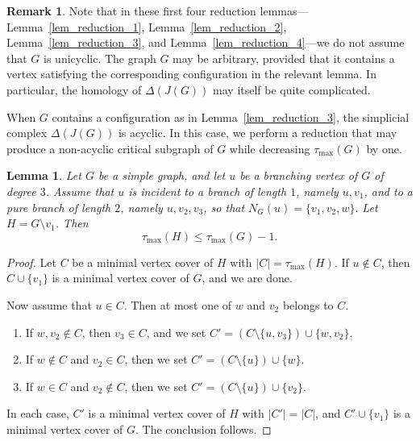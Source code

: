 \documentclass[12pt,amscd]{amsart}
\newtheorem{lem}[thm]{Lemma}
\theoremstyle{definition}
\newtheorem{rem}[thm]{Remark}
\begin{document}
\begin{rem}
Note that in these first four reduction lemmas---Lemma~\ref{lem_reduction_1}, Lemma~\ref{lem_reduction_2}, Lemma~\ref{lem_reduction_3}, and Lemma~\ref{lem_reduction_4}---we do not assume that $G$ is unicyclic. The graph $G$ may be arbitrary, provided that it contains a vertex satisfying the corresponding configuration in the relevant lemma. In particular, the homology of $\Delta(J(G))$ may itself be quite complicated.
\end{rem}

When $G$ contains a configuration as in Lemma~\ref{lem_reduction_3}, the simplicial complex $\Delta(J(G))$ is acyclic. In this case, we perform a reduction that may produce a non-acyclic critical subgraph of $G$ while decreasing $\tau_{\max}(G)$ by one.

\begin{lem}\label{lem_type_1_2}
Let $G$ be a simple graph, and let $u$ be a branching vertex of $G$ of degree $3$. Assume that $u$ is incident to a branch of length $1$, namely $u,v_1$, and to a pure branch of length $2$, namely $u,v_2,v_3$, so that \(N_G(u) = \{v_1,v_2,w\}.\) Let $H = G \setminus v_1$. Then
\[
\tau_{\max}(H) \le \tau_{\max}(G) - 1.
\]
\end{lem}

\begin{proof}
Let $C$ be a minimal vertex cover of $H$ with $|C| = \tau_{\max}(H)$. If $u \notin C$, then $C \cup \{v_1\}$ is a minimal vertex cover of $G$, and we are done.

Now assume that $u \in C$. Then at most one of $w$ and $v_2$ belongs to $C$.

\begin{enumerate}
    \item If $w, v_2 \notin C$, then $v_3 \in C$, and we set \(C' = (C \setminus \{u,v_3\}) \cup \{w,v_2\}.\)
    \item If $w \notin C$ and $v_2 \in C$, then we set
\(
C' = (C \setminus \{u\}) \cup \{w\}.
\)
\item If $w \in C$ and $v_2 \notin C$, then we set
\(
C' = (C \setminus \{u\}) \cup \{v_2\}.
\)
\end{enumerate}
In each case, $C'$ is a minimal vertex cover of $H$ with $|C'| = |C|$, and $C' \cup \{v_1\}$ is a minimal vertex cover of $G$. The conclusion follows.
\end{proof}
\end{document}
